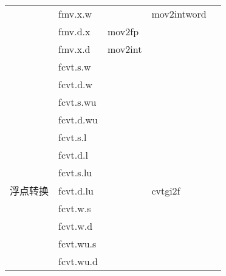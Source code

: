\begin{longtable}{lllll}
                               & fmv.x.w                          &                              & mov2intword                    \\
                               & fmv.d.x                          & mov2fp                       &                                \\
                               & fmv.x.d                          & mov2int                      &                                \\
                               & fcvt.s.w                         &                              &                                \\
                               & fcvt.d.w                         &                              &                                \\
                               & fcvt.s.wu                        &                              &                                \\
                               & fcvt.d.wu                        &                              &                                \\
                               & fcvt.s.l                         &                              &                                \\
                               & fcvt.d.l                         &                              &                                \\
                               & fcvt.s.lu                        &                              &                                \\
                               \hline
    浮点转换                     & fcvt.d.lu                        & \multirow{-8}{*}{}           & \multirow{-8}{*}{cvtgi2f}      \\
                               & fcvt.w.s                         &                              &                                \\
                               & fcvt.w.d                         &                              &                                \\
                               & fcvt.wu.s                        &                              &                                \\
                               & fcvt.wu.d                        &                              &                                \\

\end{longtable}
